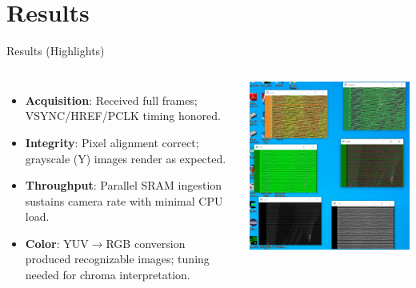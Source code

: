 \documentclass{beamer}
\begin{document}
\section{Results}
\begin{frame}{Results (Highlights)}
  \begin{columns}
\begin{itemize}
  \item \textbf{Acquisition}: Received full frames; VSYNC/HREF/PCLK timing honored.
  \item \textbf{Integrity}: Pixel alignment correct; grayscale (Y) images render as expected.
  \item \textbf{Throughput}: Parallel SRAM ingestion sustains camera rate with minimal CPU load.
  \item \textbf{Color}: YUV$\rightarrow$RGB conversion produced recognizable images; tuning needed for chroma interpretation.
\end{itemize}
\includegraphics[width=\textwidth]{hoodie_pic.png}
\end{columns}
\end{frame}
\end{document}
